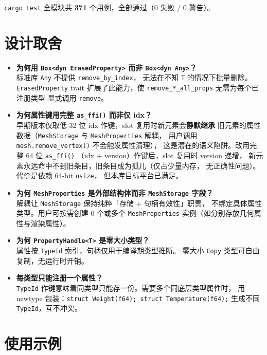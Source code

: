 \documentclass[11pt,a4paper]{article}
\begin{document}
\texttt{cargo test} 全模块共 \textbf{371} 个用例，全部通过（0 失败 / 0 警告）。

\section{设计取舍}

\begin{itemize}
  \item \textbf{为何用 \texttt{Box<dyn ErasedProperty>} 而非 \texttt{Box<dyn Any>}？} \\
        标准库 \texttt{Any} 不提供 \texttt{remove\_by\_index}，
        无法在不知 \texttt{T} 的情况下批量删除。\texttt{ErasedProperty} trait
        扩展了此能力，使 \texttt{remove\_*\_all\_props} 无需为每个已注册类型
        显式调用 \texttt{remove}。
  \item \textbf{为何属性键用完整 \texttt{as\_ffi()} 而非仅 idx？} \\
        早期版本仅取低 32 位 idx 作键，slot 复用时新元素会\textbf{静默继承}
        旧元素的属性数据（\texttt{MeshStorage} 与 \texttt{MeshProperties} 解耦，
        用户调用 \texttt{mesh.remove\_vertex()} 不会触发属性清理），
        这是潜在的语义陷阱。改用完整 64 位 \texttt{as\_ffi()}
        （idx + version）作键后，slot 复用时 version 递增，
        新元素永远命中不到旧条目，旧条目成为孤儿（仅占少量内存，
        无正确性问题）。代价是依赖 64-bit \texttt{usize}，
        但本库目标平台已满足。
  \item \textbf{为何 \texttt{MeshProperties} 是外部结构体而非 \texttt{MeshStorage} 字段？} \\
        解耦让 \texttt{MeshStorage} 保持纯粹「存储 + 句柄有效性」职责，
        不绑定具体属性类型。用户可按需创建 0 个或多个 \texttt{MeshProperties}
        实例（如分别存放几何属性与渲染属性）。
  \item \textbf{为何 \texttt{PropertyHandle<T>} 是零大小类型？} \\
        属性按 \texttt{TypeId} 索引，句柄仅用于编译期类型推断。
        零大小 \texttt{Copy} 类型可自由复制，无运行时开销。
  \item \textbf{每类型只能注册一个属性？} \\
        \texttt{TypeId} 作键意味着同类型只能存一份。需要多个同底层类型属性时，
        用 newtype 包装：\texttt{struct Weight(f64); struct Temperature(f64);}
        生成不同 \texttt{TypeId}，互不冲突。
\end{itemize}

\section{使用示例}
\end{document}

